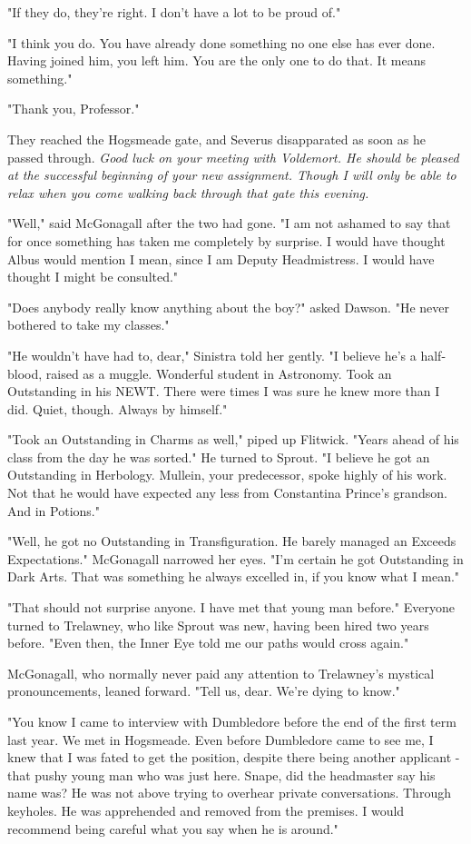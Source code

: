 "If they do, they're right. I don't have a lot to be proud of."

"I think you do. You have already done something no one else has ever done. Having joined him, you left him. You are the only one to do that. It means something."

"Thank you, Professor."

They reached the Hogsmeade gate, and Severus disapparated as soon as he passed through. \emph{Good luck on your meeting with Voldemort. He should be pleased at the successful beginning of your new assignment. Though I will only be able to relax when you come walking back through that gate this evening.}

"Well," said McGonagall after the two had gone. "I am not ashamed to say that for once something has taken me completely by surprise. I would have thought Albus would mention{\el} I mean, since I am Deputy Headmistress. I would have thought I might be consulted."

"Does anybody really know anything about the boy?" asked Dawson. "He never bothered to take my classes."

"He wouldn't have had to, dear," Sinistra told her gently. "I believe he's a half-blood, raised as a muggle. Wonderful student in Astronomy. Took an Outstanding in his NEWT. There were times I was sure he knew more than I did. Quiet, though. Always by himself."

"Took an Outstanding in Charms as well," piped up Flitwick. "Years ahead of his class from the day he was sorted." He turned to Sprout. "I believe he got an Outstanding in Herbology. Mullein, your predecessor, spoke highly of his work. Not that he would have expected any less from Constantina Prince's grandson. And in Potions."

"Well, he got no Outstanding in Transfiguration. He barely managed an Exceeds Expectations." McGonagall narrowed her eyes. "I'm certain he got Outstanding in Dark Arts. That was something he always excelled in, if you know what I mean."

"That should not surprise anyone. I have met that young man before." Everyone turned to Trelawney, who like Sprout was new, having been hired two years before. "Even then, the Inner Eye told me our paths would cross again."

McGonagall, who normally never paid any attention to Trelawney's mystical pronouncements, leaned forward. "Tell us, dear. We're dying to know."

"You know I came to interview with Dumbledore before the end of the first term last year. We met in Hogsmeade. Even before Dumbledore came to see me, I knew that I was fated to get the position, despite there being another applicant - that pushy young man who was just here. Snape, did the headmaster say his name was? He was not above trying to overhear private conversations. Through keyholes. He was apprehended and removed from the premises. I would recommend being careful what you say when he is around."

